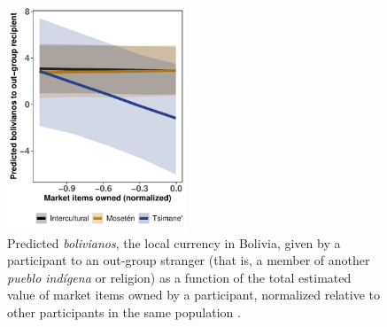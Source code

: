 \documentclass[bibauthoryear]{aa}
\begin{document}
 \begin{figure}[t]
	\centering
	\includegraphics[width=2.1in]{Market_items}
	\caption{{\footnotesize Predicted \textit{bolivianos}, the local currency in Bolivia, given by a participant to an out-group stranger (that is, a member of another \textit{pueblo ind\'igena} or religion) as a function of the total estimated value of market items owned by a participant, normalized relative to other participants in the same population \citep{pisor2016risk, pisor2018diversify}.}} \label{boliviamarket}
\end{figure}
\end{document}
